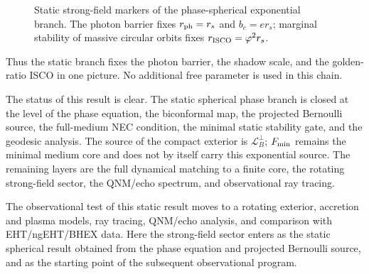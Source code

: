 \documentclass[12pt]{article}
\begin{document}
\begin{figure}[t]
\centering
{}
\caption{Static strong-field markers of the phase-spherical exponential branch. The photon barrier fixes $r_{\rm ph}=r_s$ and $b_c=e r_s$; marginal stability of massive circular orbits fixes $r_{\rm ISCO}=\varphi^2r_s$.}
\label{fig:strong-field-markers}
\end{figure}

Thus the static branch fixes the photon barrier, the shadow scale, and the golden-ratio ISCO in one picture. No additional free parameter is used in this chain.

The status of this result is clear. The static spherical phase branch is closed at the level of the phase equation, the biconformal map, the projected Bernoulli source, the full-medium NEC condition, the minimal static stability gate, and the geodesic analysis. The source of the compact exterior is $\mathcal L_B^\perp$; $F_{\rm min}$ remains the minimal medium core and does not by itself carry this exponential source. The remaining layers are the full dynamical matching to a finite core, the rotating strong-field sector, the QNM/echo spectrum, and observational ray tracing.

The observational test of this static result moves to a rotating exterior, accretion and plasma models, ray tracing, QNM/echo analysis, and comparison with EHT/ngEHT/BHEX data. Here the strong-field sector enters as the static spherical result obtained from the phase equation and projected Bernoulli source, and as the starting point of the subsequent observational program.
\end{document}

